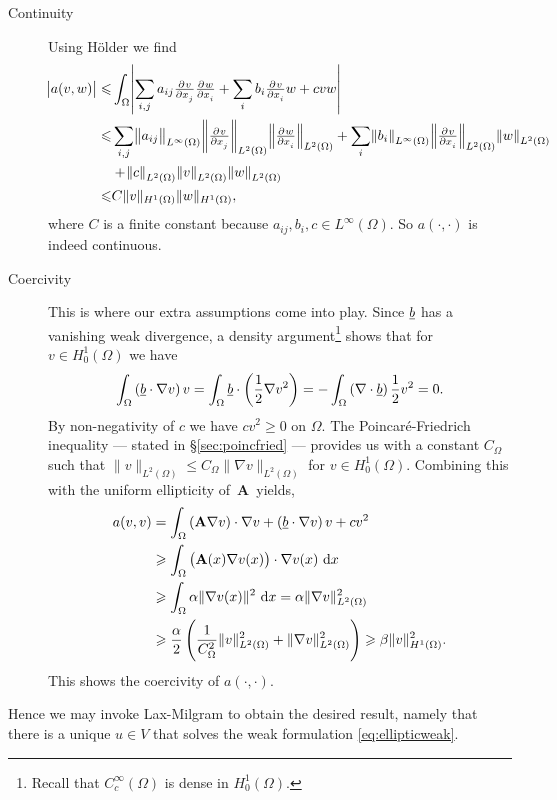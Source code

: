 \documentclass[thesis.tex]{subfiles}
\begin{document}
\begin{description}
  \item[Continuity]Using H\"older we find
    \begin{align*}
      \abs{a(v,w)} \leq &\int_\Omega \abs{\sum_{i,j} a_{ij} \pd{v}{x_j}\pd{w}{x_i}  + \sum_i b_i \pd{v}{x_i}w + cvw}\\
                   \leq &\sum_{i,j} \norm{ a_{ij}}_{L^\infty(\Omega)} \norm{ \pd{v}{x_j}}_{L^2(\Omega)} \norm{ \pd{w}{x_i}}_{L^2(\Omega)} + \sum_i \norm{b_i}_{L^\infty(\Omega)} \norm{\pd{v}{x_i}}_{L^2(\Omega)} \norm{w}_{L^2(\Omega)} \\
                   &+ \norm{c}_{L^2(\Omega)} \norm{v}_{L^2(\Omega)} \norm{w}_{L^2(\Omega)} \\
                   \leq &C \|v\|_{H^1(\Omega)} \|w\|_{H^1(\Omega)},
    \end{align*}
    where $C$ is a finite constant because $a_{ij}, b_i, c \in L^\infty(\Omega)$. So $a(\cdot,\cdot)$ is indeed continuous.
  \item[Coercivity] This is where our extra assumptions come into play. Since $\underline{b}$ has a vanishing weak divergence, a density argument\footnote{Recall that $C_c^\infty(\Omega)$ is dense in $H_0^1(\Omega)$.} shows that for $v \in H_0^1(\Omega)$ we have
    \[
      \int_\Omega \left(\underline{b} \cdot \nabla v\right)v  = \int_\Omega \underline{b} \cdot \left({1 \over 2} \nabla v^2\right) = - \int_\Omega \left(\nabla \cdot \underline{b} \right) {1 \over 2} v^2 = 0.
    \]
    By non-negativity of $c$ we have $cv^2 \geq 0$ on $\Omega$. 
    The Poincar\'e-Friedrich  inequality --- stated in \S\ref{sec:poincfried} --- provides us with a constant $C_\Omega$ such that $\|v\|_{L^2(\Omega)} \leq C_\Omega \|\nabla v\|_{L^2(\Omega)}$ for $v \in H_0^1(\Omega)$. Combining this with the uniform ellipticity of~$\mathbf{A}$~yields,
    \begin{align*}
      a(v,v) &= \int_\Omega \left(\mathbf{A} \nabla v\right) \cdot \nabla v + \left(\v{b} \cdot \nabla v\right)v + cv^2 \\
      &\geq  \int_\Omega \left(\mathbf{A}(x) \nabla v(x)\right) \cdot \nabla v(x)\, \dif x \\
             &\geq  \int_\Omega \alpha \|\nabla v(x)\|^2\, \dif x = \alpha \|\nabla v\|^2_{L^2(\Omega)}\\
             &\geq \frac{\alpha}{2} \left(\frac{1}{C^2_\Omega} \|v\|^2_{L^2(\Omega)} + \|\nabla v\|^2_{L^2(\Omega)}\right) \geq \beta \|v\|^2_{H^1(\Omega)}.
    \end{align*}
    This shows the coercivity of $a(\cdot, \cdot)$.
\end{description}
Hence we may invoke Lax-Milgram to obtain the desired result, namely that there is a unique $u \in V$ that solves the weak formulation \eqref{eq:ellipticweak}.
\end{document}

